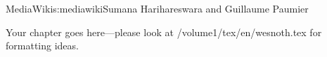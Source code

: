 \begin{aosachapter}{MediaWiki}{s:mediawiki}{Sumana Harihareswara and Guillaume Paumier}

Your chapter goes here---please look at /volume1/tex/en/wesnoth.tex for 
formatting ideas.

\end{aosachapter}
